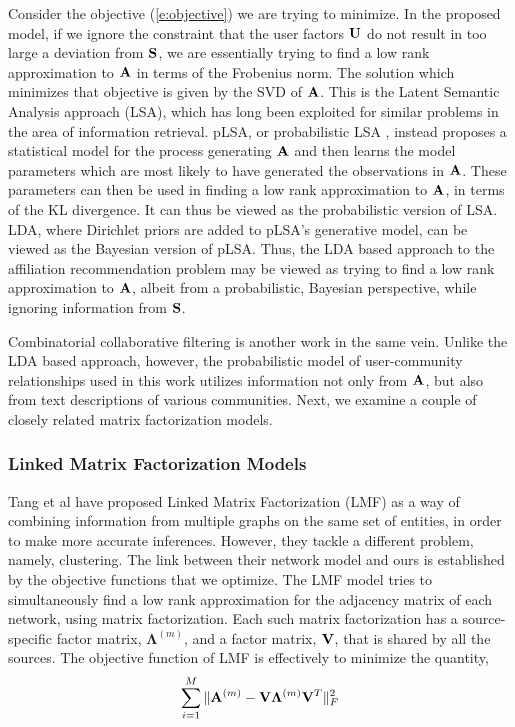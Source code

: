 Consider the objective (\ref{e:objective}) we are trying to minimize. In the proposed model, if we ignore the constraint that the user factors $\mathbf{U}$ do not result in too large a deviation from $\mathbf{S}$, we are essentially trying to find a low rank approximation to $\mathbf{A}$ in terms of the Frobenius norm. The solution which minimizes that objective is given by the SVD of $\mathbf{A}$. This is the Latent Semantic Analysis approach (LSA), which has long been exploited for similar problems in the area of information retrieval. pLSA, or probabilistic LSA \cite{HofmannPLSI}, instead proposes a statistical model for the process generating $\mathbf{A}$ and then learns the model parameters which are most likely to have generated the observations in $\mathbf{A}$. These parameters can then be used in finding a low rank approximation to $\mathbf{A}$, in terms of the KL divergence. It can thus be viewed as the probabilistic version of LSA. LDA, where Dirichlet priors are added to pLSA's generative model, can be viewed as the Bayesian version of pLSA. Thus, the LDA based approach to the affiliation recommendation problem may be viewed as trying to find a low rank approximation to $\mathbf{A}$, albeit from a probabilistic, Bayesian perspective, while ignoring information from $\mathbf{S}$.

Combinatorial collaborative filtering \cite{GoogleCCF} is another work in the same vein. Unlike the LDA based approach, however, the probabilistic model of user-community relationships used in this work utilizes information not only from $\mathbf{A}$, but also from text descriptions of various communities. Next, we examine a couple of closely related matrix factorization models.

\subsubsection{Linked Matrix Factorization Models}
Tang et al have proposed Linked Matrix Factorization (LMF) \cite{WeiLMF} as a way of combining information from multiple graphs on the same set of entities, in order to make more accurate inferences. However, they tackle a different problem, namely, clustering. The link between their network model and ours is established by the objective functions that we optimize. The LMF model tries to simultaneously find a low rank approximation for the adjacency matrix of each network, using matrix factorization. Each such matrix factorization has a source-specific factor matrix, $\mathbf{\Lambda}^{(m)}$, and a factor matrix, $\mathbf{V}$, that is shared by all the sources. The objective function of LMF is effectively to minimize the quantity,
\begin{equation*}
\displaystyle\sum_{i=1}^{M}\|\mathbf{A}^{(m)} - \mathbf{V} \mathbf{\Lambda}^{(m)} \mathbf{V}^T\|_{F}^2
\label{e:LMF}
\end{equation*}

